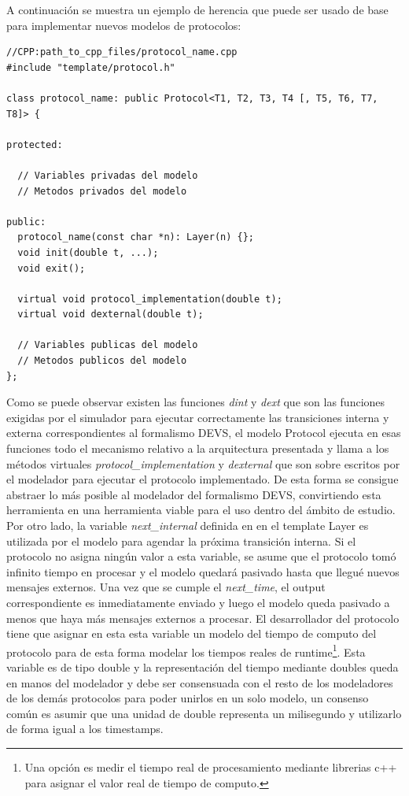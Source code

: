\documentclass[10pt,a4paper]{article}
\begin{document}
A continuación se muestra un ejemplo de herencia que puede ser usado de base para implementar nuevos modelos de protocolos: \\

\begin{lstlisting}
//CPP:path_to_cpp_files/protocol_name.cpp
#include "template/protocol.h"

class protocol_name: public Protocol<T1, T2, T3, T4 [, T5, T6, T7, T8]> { 

protected:
	
  // Variables privadas del modelo
  // Metodos privados del modelo

public:
  protocol_name(const char *n): Layer(n) {};
  void init(double t, ...);
  void exit();

  virtual void protocol_implementation(double t);
  virtual void dexternal(double t);
  
  // Variables publicas del modelo
  // Metodos publicos del modelo
};
\end{lstlisting}

Como se puede observar existen las funciones \textit{dint} y \textit{dext} que son las funciones exigidas por el simulador para ejecutar correctamente las transiciones interna y externa correspondientes al formalismo DEVS, el modelo Protocol ejecuta en esas funciones todo el mecanismo relativo a la arquitectura presentada y llama a los métodos virtuales \textit{protocol\_implementation} y \textit{dexternal} que son sobre escritos por el modelador para ejecutar el protocolo implementado. De esta forma se consigue abstraer lo más posible al modelador del formalismo DEVS, convirtiendo esta herramienta en una herramienta viable para el uso dentro del ámbito de estudio. \\

Por otro lado, la variable \textit{next\_internal} definida en en el template Layer es utilizada por el modelo para agendar la próxima transición interna. Si el protocolo no asigna ningún valor a esta variable, se asume que el protocolo tomó infinito tiempo en procesar y el modelo quedará pasivado hasta que llegué nuevos mensajes externos. Una vez que se cumple el \textit{next\_time}, el output correspondiente es inmediatamente enviado y luego el modelo queda pasivado a menos que haya más mensajes externos a procesar. El desarrollador del protocolo tiene que asignar en esta esta variable un modelo del tiempo de computo del protocolo para de esta forma modelar los tiempos reales de runtime\footnote{Una opción es medir el tiempo real de procesamiento mediante librerias c++ para asignar el valor real de tiempo de computo.}. Esta variable es de tipo double y la representación del tiempo mediante doubles queda en manos del modelador y debe ser consensuada con el resto de los modeladores de los demás protocolos para poder unirlos en un solo modelo, un consenso común es asumir que una unidad de double representa un milisegundo y utilizarlo de forma igual a los timestamps. \\
\end{document}
